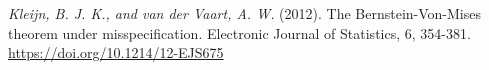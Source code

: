 \documentclass[12pt, twoside]{article}
\numberwithin{equation}{section}
\begin{document}
\begin{thebibliography}{99}
	\textit{Kleijn, B. J. K., and van der Vaart, A. W.}  (2012). The Bernstein-Von-Mises theorem under misspecification. Electronic Journal of Statistics, 6, 354-381. \url{https://doi.org/10.1214/12-EJS675}

\end{thebibliography}
\end{document}
